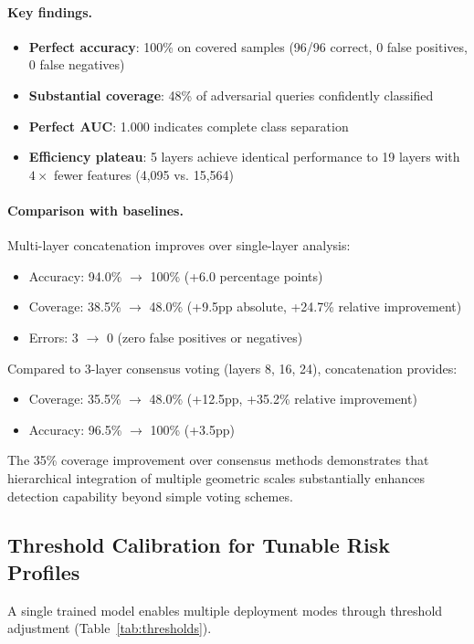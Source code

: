 \documentclass[11pt]{article}
\begin{document}
\paragraph{Key findings.}
\begin{itemize}
\item \textbf{Perfect accuracy}: 100\% on covered samples (96/96 correct, 0 false positives, 0 false negatives)
\item \textbf{Substantial coverage}: 48\% of adversarial queries confidently classified
\item \textbf{Perfect AUC}: 1.000 indicates complete class separation
\item \textbf{Efficiency plateau}: 5 layers achieve identical performance to 19 layers with $4\times$ fewer features (4,095 vs. 15,564)
\end{itemize}

\paragraph{Comparison with baselines.} Multi-layer concatenation improves over single-layer analysis:
\begin{itemize}
\item Accuracy: 94.0\% $\to$ 100\% (+6.0 percentage points)
\item Coverage: 38.5\% $\to$ 48.0\% (+9.5pp absolute, +24.7\% relative improvement)
\item Errors: 3 $\to$ 0 (zero false positives or negatives)
\end{itemize}

Compared to 3-layer consensus voting (layers 8, 16, 24), concatenation provides:
\begin{itemize}
\item Coverage: 35.5\% $\to$ 48.0\% (+12.5pp, +35.2\% relative improvement)
\item Accuracy: 96.5\% $\to$ 100\% (+3.5pp)
\end{itemize}

The 35\% coverage improvement over consensus methods demonstrates that hierarchical integration of multiple geometric scales substantially enhances detection capability beyond simple voting schemes.

\subsection{Threshold Calibration for Tunable Risk Profiles}

A single trained model enables multiple deployment modes through threshold adjustment (Table~\ref{tab:thresholds}).
\end{document}
